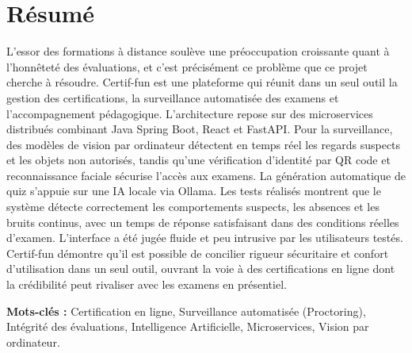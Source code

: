 \chapter*{Résumé}

L'essor des formations à distance soulève une préoccupation croissante quant à l'honnêteté des évaluations, et c'est précisément ce problème que ce projet cherche à résoudre. Certif-fun est une plateforme qui réunit dans un seul outil la gestion des certifications, la surveillance automatisée des examens et l'accompagnement pédagogique. L'architecture repose sur des microservices distribués combinant Java Spring Boot, React et FastAPI. Pour la surveillance, des modèles de vision par ordinateur détectent en temps réel les regards suspects et les objets non autorisés, tandis qu'une vérification d'identité par QR code et reconnaissance faciale sécurise l'accès aux examens. La génération automatique de quiz s'appuie sur une IA locale via Ollama. Les tests réalisés montrent que le système détecte correctement les comportements suspects, les absences et les bruits continus, avec un temps de réponse satisfaisant dans des conditions réelles d'examen. L'interface a été jugée fluide et peu intrusive par les utilisateurs testés. Certif-fun démontre qu'il est possible de concilier rigueur sécuritaire et confort d'utilisation dans un seul outil, ouvrant la voie à des certifications en ligne dont la crédibilité peut rivaliser avec les examens en présentiel.

\bigskip
\noindent \textbf{Mots-clés :} Certification en ligne, Surveillance automatisée (Proctoring), Intégrité des évaluations, Intelligence Artificielle, Microservices, Vision par ordinateur.
